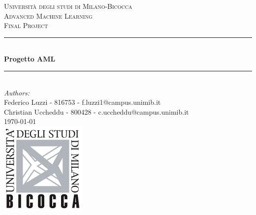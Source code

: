 \documentclass[10pt, a4paper,openany]{article}
\begin{document}
\begin{titlepage}
	
	\newcommand{\HRule}{\rule{\linewidth}{0.5mm}} 
	
	\begin{center} 

	
	\textsc{\LARGE Università degli studi di Milano-Bicocca}\\[1cm] %
	\textsc{\Large Advanced Machine Learning }\\[0.3cm] %
	\textsc{\large Final Project}\\[0.1cm] %
	

	
	\HRule \\[0.4cm]
	{ \huge \bfseries Progetto AML}\\[0.4cm] %
	\HRule \\[1.5cm]
	
	
	\large
	\emph{Authors:}\\
	Federico Luzzi - 816753  - f.luzzi1@campus.unimib.it \\  
	Christian Uccheddu - 800428  - c.uccheddu@campus.unimib.it   \\[1cm]
	
	
	
	{\large \today}\\[2cm] %
	
	
	\includegraphics{pics/logo.png}\\[1cm] %
	
	
	\vfill %
\end{center}
\end{titlepage}
\end{document}
